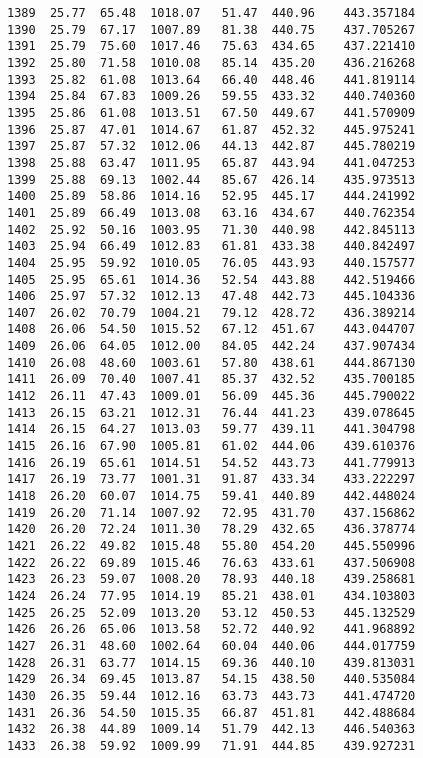 \documentclass[11pt]{article}
\begin{document}
\begin{tcolorbox}[breakable, size=fbox, boxrule=.5pt, pad at break*=1mm, opacityfill=0]
\begin{Verbatim}[commandchars=\\\{\}]
1389  25.77  65.48  1018.07   51.47  440.96    443.357184
1390  25.79  67.17  1007.89   81.38  440.75    437.705267
1391  25.79  75.60  1017.46   75.63  434.65    437.221410
1392  25.80  71.58  1010.08   85.14  435.20    436.216268
1393  25.82  61.08  1013.64   66.40  448.46    441.819114
1394  25.84  67.83  1009.26   59.55  433.32    440.740360
1395  25.86  61.08  1013.51   67.50  449.67    441.570909
1396  25.87  47.01  1014.67   61.87  452.32    445.975241
1397  25.87  57.32  1012.06   44.13  442.87    445.780219
1398  25.88  63.47  1011.95   65.87  443.94    441.047253
1399  25.88  69.13  1002.44   85.67  426.14    435.973513
1400  25.89  58.86  1014.16   52.95  445.17    444.241992
1401  25.89  66.49  1013.08   63.16  434.67    440.762354
1402  25.92  50.16  1003.95   71.30  440.98    442.845113
1403  25.94  66.49  1012.83   61.81  433.38    440.842497
1404  25.95  59.92  1010.05   76.05  443.93    440.157577
1405  25.95  65.61  1014.36   52.54  443.88    442.519466
1406  25.97  57.32  1012.13   47.48  442.73    445.104336
1407  26.02  70.79  1004.21   79.12  428.72    436.389214
1408  26.06  54.50  1015.52   67.12  451.67    443.044707
1409  26.06  64.05  1012.00   84.05  442.24    437.907434
1410  26.08  48.60  1003.61   57.80  438.61    444.867130
1411  26.09  70.40  1007.41   85.37  432.52    435.700185
1412  26.11  47.43  1009.01   56.09  445.36    445.790022
1413  26.15  63.21  1012.31   76.44  441.23    439.078645
1414  26.15  64.27  1013.03   59.77  439.11    441.304798
1415  26.16  67.90  1005.81   61.02  444.06    439.610376
1416  26.19  65.61  1014.51   54.52  443.73    441.779913
1417  26.19  73.77  1001.31   91.87  433.34    433.222297
1418  26.20  60.07  1014.75   59.41  440.89    442.448024
1419  26.20  71.14  1007.92   72.95  431.70    437.156862
1420  26.20  72.24  1011.30   78.29  432.65    436.378774
1421  26.22  49.82  1015.48   55.80  454.20    445.550996
1422  26.22  69.89  1015.46   76.63  433.61    437.506908
1423  26.23  59.07  1008.20   78.93  440.18    439.258681
1424  26.24  77.95  1014.19   85.21  438.01    434.103803
1425  26.25  52.09  1013.20   53.12  450.53    445.132529
1426  26.26  65.06  1013.58   52.72  440.92    441.968892
1427  26.31  48.60  1002.64   60.04  440.06    444.017759
1428  26.31  63.77  1014.15   69.36  440.10    439.813031
1429  26.34  69.45  1013.87   54.15  438.50    440.535084
1430  26.35  59.44  1012.16   63.73  443.73    441.474720
1431  26.36  54.50  1015.35   66.87  451.81    442.488684
1432  26.38  44.89  1009.14   51.79  442.13    446.540363
1433  26.38  59.92  1009.99   71.91  444.85    439.927231

\end{Verbatim}
\end{tcolorbox}
\end{document}
